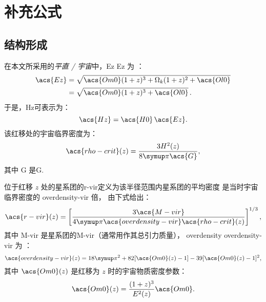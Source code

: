 
\chapter{补充公式}
\label{chap:formulas}

\section{结构形成}

在本文所采用的\emph{平直 \lcdm/ 宇宙}中，\acl{Ez} \acs{Ez} 为 \cite{hogg1999}：
\begin{align}
  \label{eq:Ez}
  \acs{Ez}
    & = \sqrt{\acs{Om0} (1+z)^3 + \Omega_k (1+z)^2 + \acs{Ol0}}  \\
    & = \sqrt{\acs{Om0} (1+z)^3 + \acs{Ol0}} \, .
\end{align}
于是，\acl{Hz}可表示为：
\begin{equation}
  \label{eq:hubble-z}
  \acs{Hz} = \acs{H0} \, \acs{Ez} .
\end{equation}
该红移处的宇宙临界密度为：
\begin{equation}
  \label{eq:rho-crit}
  \acs{rho-crit}(z) = \frac{3 H^2(z)}{8 \Cpi \acs{G}} ,
\end{equation}
其中 \acs{G} 是\acl{G}.

位于红移 $z$ 处的星系团的\acf{r-vir}定义为该半径范围内星系团的平均密度
是当时宇宙临界密度的 \acs{overdensity-vir} 倍，
由下式给出：
\begin{equation}
  \label{eq:radius-virial}
  \acs{r-vir}(z) = \left[
    \frac{3 \acs{M-vir}}{4\Cpi \acs{overdensity-vir} \acs{rho-crit}(z)}
  \right]^{1/3},
\end{equation}
其中 \acs{M-vir} 是星系团的\acl{M-vir}（通常用作其总引力质量），
\acf{overdensity} \acs{overdensity-vir} 为 \cite{bryan1998}：
\begin{equation}
  \label{eq:delta-vir}
  \acs{overdensity-vir}(z)
    = 18\Cpi^2 + 82 [\acs{Om0}(z) - 1] - 39 [\acs{Om0}(z) - 1]^2 ,
\end{equation}
其中 $\acs{Om0}(z)$ 是红移为 $z$ 时的宇宙物质密度参数：
\begin{equation}
  \label{eq:omega-m-z}
  \acs{Om0}(z) = \frac{(1+z)^3}{E^2(z)} \acs{Om0} .
\end{equation}

